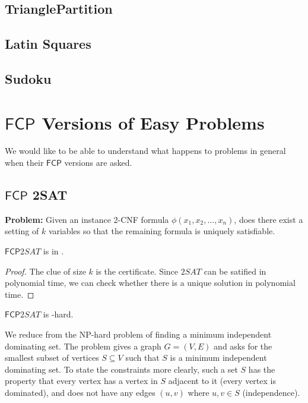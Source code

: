 \documentclass[runningheads,a4paper]{llncs}
\begin{document}
\subsection{TrianglePartition}

\subsection{Latin Squares}

\subsection{Sudoku}

\section{$\mathsf{FCP}$ Versions of Easy Problems}

We would like to be able to understand what happens to problems in general when their $\mathsf{FCP}$ versions are asked. 

\subsection{$\mathsf{FCP}$ 2SAT} 

\textbf{Problem:} Given an instance 2-CNF formula $\phi(x_1,x_2,\dots,x_n)$, does there exist a setting of $k$ variables so that the remaining formula is uniquely satisfiable.

\begin{proposition}
$\mathsf{FCP} 2SAT$ is in \NP.
\end{proposition}

\begin{proof}
The clue of size $k$ is the certificate. Since $2SAT$ can be satified in polynomial time, we can check whether there is a unique solution in polynomial time.
\end{proof}

\begin{theorem} 
$\mathsf{FCP} 2SAT$ is \NP-hard.
\end{theorem}

We reduce from the NP-hard problem of finding a minimum independent dominating set. The problem gives a graph $G = (V,E)$ and asks for the smallest subset of vertices $S \subseteq V$ such that $S$ is a minimum independent dominating set. To state the constraints more clearly, such a set $S$ has the property that every vertex has a vertex in $S$ adjacent to it (every vertex is dominated), and does not have any edges $(u,v)$ where $u,v \in S$ (independence). \\
\end{document}
